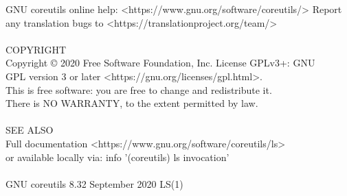 \documentclass{article}
\begin{document}
       GNU coreutils online help: <https://www.gnu.org/software/coreutils/>
       Report any translation bugs to <https://translationproject.org/team/> \\
\\
COPYRIGHT \\
       Copyright © 2020 Free Software Foundation, Inc.   License  GPLv3+:  GNU \\
       GPL version 3 or later <https://gnu.org/licenses/gpl.html>. \\
       This  is  free  software:  you  are free to change and redistribute it. \\
       There is NO WARRANTY, to the extent permitted by law. \\
\\
SEE ALSO \\
       Full documentation <https://www.gnu.org/software/coreutils/ls> \\
       or available locally via: info '(coreutils) ls invocation' \\
\\
GNU coreutils 8.32              September 2020                           LS(1) \\
\end{document}
